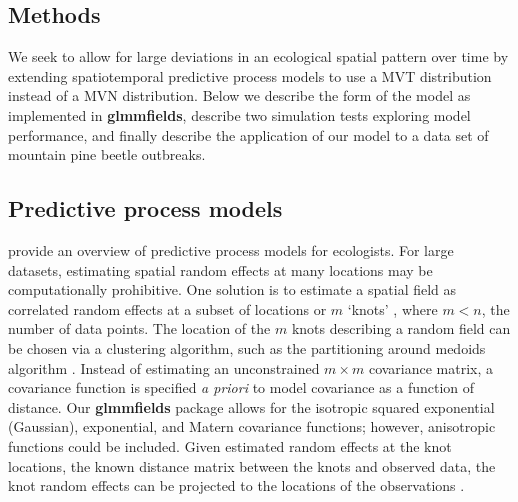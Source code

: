 \documentclass[12pt,english]{article}
\begin{document}
\begin{spacing}{1.9}
\section{Methods}

We seek to allow for large deviations in an ecological spatial pattern over time
by extending spatiotemporal predictive process models to use a MVT distribution
instead of a MVN distribution. Below we describe the form of the model as
implemented in \textbf{glmmfields}, describe two simulation tests exploring
model performance, and finally describe the application of our model to a data
set of mountain pine beetle outbreaks.

\subsection{Predictive process models}

\citet{latimer2009} provide an overview of predictive process models for
ecologists. For large datasets, estimating spatial random effects at many
locations may be computationally prohibitive. One solution is to estimate a
spatial field as correlated random effects at a subset of locations or $m$
`knots' \citep[e.g.][]{latimer2009, shelton2014}, where $m < n$, the number of
data points. The location of the $m$ knots describing a random field can be
chosen via a clustering algorithm, such as the partitioning around medoids
algorithm \citep{reynolds2006}.
Instead of estimating an unconstrained $m \times m$ covariance matrix, a
covariance function is specified \emph{a priori} to model covariance as a
function of distance. Our \textbf{glmmfields} package allows for the isotropic
squared exponential (Gaussian), exponential, and Matern covariance functions;
however, anisotropic functions could be included. Given estimated random effects
at the knot locations, the known distance matrix between the knots and observed
data, the knot random effects can be projected to the locations of the
observations \citep[][Fig.~\ref{fig:didactic}]{roislien2007, latimer2009,
  finley2009}.


\end{spacing}
\end{document}
